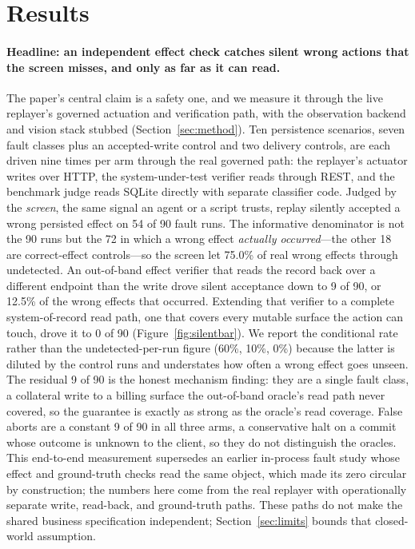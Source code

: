 \section{Results}
\label{sec:results}

\paragraph{Headline: an independent effect check catches silent wrong actions
that the screen misses, and only as far as it can read.} The paper's central
claim is a safety one, and we measure it through the live replayer's governed
actuation and verification path, with the observation backend and vision stack
stubbed (Section~\ref{sec:method}).
Ten persistence scenarios, seven fault classes plus an accepted-write control and
two delivery controls, are each driven nine times per arm through the real
governed path: the replayer's actuator writes over HTTP, the system-under-test
verifier reads through REST, and the benchmark judge reads SQLite directly with
separate classifier code. Judged by the \emph{screen},
the same signal an agent
or a script trusts, replay silently accepted a wrong persisted effect on 54 of 90
fault runs. The informative denominator is not the 90 runs but the 72 in which a
wrong effect \emph{actually occurred}---the other 18 are correct-effect
controls---so the screen let 75.0\% of real wrong effects through undetected. An
out-of-band effect verifier that reads the record back over
a different endpoint than the write drove silent acceptance down to 9 of 90,
or 12.5\% of the wrong effects that occurred. Extending that verifier to a
complete system-of-record read path, one
that covers every mutable surface the action can touch, drove it to 0 of 90
(Figure~\ref{fig:silentbar}). We report the conditional rate rather than the
undetected-per-run figure (60\%, 10\%, 0\%) because the latter is diluted by the
control runs and understates how often a wrong effect goes unseen. The residual
9 of 90 is the honest mechanism
finding: they are a single fault class, a collateral write to a billing surface
the out-of-band oracle's read path never covered, so the guarantee is exactly as
strong as the oracle's read coverage. False aborts are a constant 9 of 90 in all
three arms, a conservative halt on a commit whose outcome is unknown to the
client, so they do not distinguish the oracles. This end-to-end measurement
supersedes an earlier in-process fault study whose effect and ground-truth checks
read the same object, which made its zero circular by construction; the numbers
here come from the real replayer with operationally separate write, read-back,
and ground-truth paths. These paths do not make the shared business
specification independent; Section~\ref{sec:limits} bounds that closed-world
assumption.

